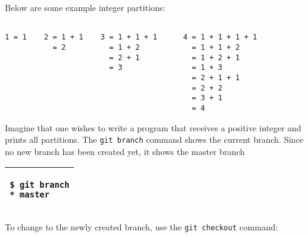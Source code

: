 Below are some example integer partitions:

\begin{verbatim}

1 = 1    2 = 1 + 1    3 = 1 + 1 + 1      4 = 1 + 1 + 1 + 1
           = 2          = 1 + 2            = 1 + 1 + 2
                        = 2 + 1            = 1 + 2 + 1
                        = 3                = 1 + 3
                                           = 2 + 1 + 1
                                           = 2 + 2
                                           = 3 + 1
                                           = 4
\end{verbatim}



Imagine that one wishes to write a program that receives a positive
integer and prints all partitions.  The {\tt git branch} command shows
the current branch. Since no new branch has been created yet, it shows
the master branch

\vspace{0.2in}
\noindent
\begin{tabular}{|p{5in}|}\hline
\begin{verbatim}
$ git branch
* master
\end{verbatim}
\\ \hline
\end{tabular}
\vspace{0.2in}

If a name is given after {\tt git branch}, a new branch is
created. The following command creates a new branch called {\tt
  partition}.

\vspace{0.2in}
\noindent
\begin{tabular}{|p{5in}|}\hline
\begin{verbatim}
$ git branch partition
\end{verbatim}
\\ \hline
\end{tabular}
\vspace{0.2in}

To change to the newly created branch, use the {\tt git checkout} command:

